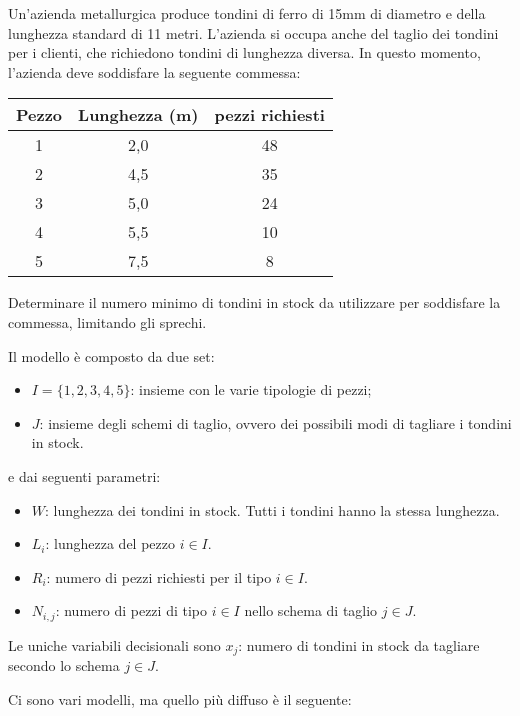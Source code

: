 Un'azienda metallurgica produce tondini di ferro di 15mm di diametro e della lunghezza standard di 11 metri. L'azienda si occupa anche del taglio dei tondini per i clienti, che richiedono tondini di lunghezza diversa. In questo momento, l'azienda deve soddisfare la seguente commessa:

\begin{table}[htbp]
	\centering
	\begin{tabular}{|c|c|c|}
		\hline
		Pezzo & Lunghezza (m) & pezzi richiesti \\ \hline
		1    & 2,0          & 48              \\ \hline
		2    & 4,5          & 35              \\ \hline
		3    & 5,0          & 24              \\ \hline
		4    & 5,5          & 10              \\ \hline
		5    & 7,5          & 8               \\ \hline
	\end{tabular}
\end{table}

Determinare il numero minimo di tondini in stock da utilizzare per soddisfare la commessa, limitando gli sprechi.

Il modello è composto da due set:
\begin{itemize}
	\item $I = \{1,2,3,4,5\}$: insieme con le varie tipologie di pezzi;
	\item $J$: insieme degli schemi di taglio, ovvero dei possibili modi di tagliare i tondini in stock.
\end{itemize}

e dai seguenti parametri:

\begin{itemize}
	\item $W$: lunghezza dei tondini in stock. Tutti i tondini hanno la stessa lunghezza.
	\item $L_i$: lunghezza del pezzo $i \in I$.
	\item $R_i$: numero di pezzi richiesti per il tipo $i \in I$.
	\item $N_{i,j}$: numero di pezzi di tipo $i \in I$ nello schema di taglio $j \in J$.
\end{itemize}

\noindent Le uniche variabili decisionali sono $x_j$: numero di tondini in stock da tagliare secondo lo schema $j \in J$.

Ci sono vari modelli, ma quello più diffuso è il seguente:

